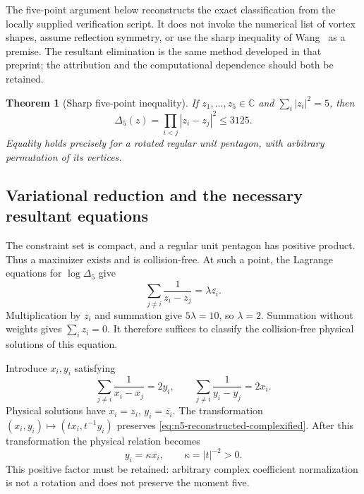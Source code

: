 \documentclass[11pt]{article}
\newtheorem{theorem}{Theorem}[section]
\theoremstyle{remark}
\newcommand{\C}{\mathbb C}
\numberwithin{equation}{section}
\begin{document}
The five-point argument below reconstructs the exact classification from
the locally supplied verification script. It does not invoke the numerical
list of vortex shapes, assume reflection symmetry, or use the sharp
inequality of Wang~\cite{Wang} as a premise. The resultant elimination is
the same method developed in that preprint; the attribution and the
computational dependence should both be retained.

\begin{theorem}[Sharp five-point inequality]
\label{thm:n5-reconstructed-sharp}
If $z_1,\ldots,z_5\in\C$ and $\sum_i|z_i|^2=5$, then
\[
 \Delta_5(z)=\prod_{i<j}|z_i-z_j|^2\le3125.
\]
Equality holds precisely for a rotated regular unit pentagon, with
arbitrary permutation of its vertices.
\end{theorem}

\subsection{Variational reduction and the necessary resultant equations}
The constraint set is compact, and a regular unit pentagon has positive
product. Thus a maximizer exists and is collision-free. At such a point,
the Lagrange equations for $\log\Delta_5$ give
\[
 \sum_{j\ne i}\frac1{z_i-z_j}=\lambda\overline{z_i}.
\]
Multiplication by $z_i$ and summation give $5\lambda=10$, so
$\lambda=2$. Summation without weights gives $\sum_i z_i=0$.
It therefore suffices to classify the collision-free physical solutions
of this equation.

Introduce $x_i,y_i$ satisfying
\begin{equation}\label{eq:n5-reconstructed-complexified}
 \sum_{j\ne i}\frac1{x_i-x_j}=2y_i,
 \qquad
 \sum_{j\ne i}\frac1{y_i-y_j}=2x_i.
\end{equation}
Physical solutions have $x_i=z_i$, $y_i=\overline{z_i}$.
The transformation $(x_i,y_i)\mapsto(t x_i,t^{-1}y_i)$ preserves
\eqref{eq:n5-reconstructed-complexified}. After this transformation the
physical relation becomes
\begin{equation}\label{eq:n5-reconstructed-kappa}
 y_i=\kappa\overline{x_i},\qquad \kappa=|t|^{-2}>0.
\end{equation}
This positive factor must be retained: arbitrary complex coefficient
normalization is not a rotation and does not preserve the moment five.
\end{document}

